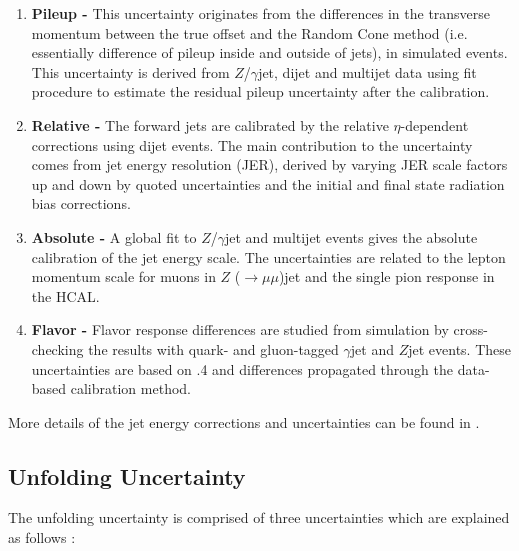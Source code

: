 \begin{enumerate}
\item {\bf Pileup -} This uncertainty originates from the differences in the transverse momentum between the true offset and the Random Cone method (i.e. essentially difference of pileup inside and outside of jets), in simulated events. This uncertainty is derived from $Z$/$\gamma$\plusn jet, dijet and multijet data using fit procedure to estimate the residual pileup uncertainty after the calibration. 

\item {\bf Relative -} The forward jets are calibrated by the relative $\eta$-dependent corrections using dijet events. The main contribution to the uncertainty comes from jet energy resolution (JER), derived by varying JER scale factors up and down by quoted uncertainties and the initial and final state radiation bias corrections.

\item {\bf Absolute -} A global fit to $Z$/$\gamma$\plusn jet and multijet events gives the absolute calibration of the jet energy scale. The uncertainties are related to the lepton momentum scale for muons in $Z$ ($\rightarrow\mu\mu$)\plusn jet and the single pion response in the HCAL. 

\item {\bf Flavor -} Flavor response differences are studied from simulation by cross-checking the results with quark- and gluon-tagged $\gamma$\plusn jet and $Z$\plusn jet events. These uncertainties are based on \PYTHIASn.4 and  differences propagated through the data-based calibration method.
\end{enumerate}
More details of the jet energy corrections and uncertainties can be found in \cite{JEC}. 

\subsection{Unfolding Uncertainty}
\label{sec:unfolding_unc}

The unfolding uncertainty is comprised of three uncertainties which are explained as follows :

